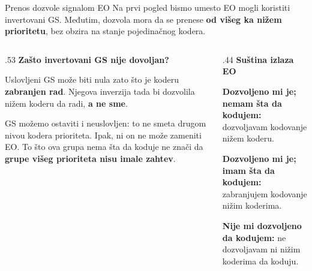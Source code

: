 \begin{frame}[t,label=03-s020b]{Prenos dozvole signalom EO}
\setlength{\parskip}{0pt}
\fontsize{11}{13}\selectfont
Na prvi pogled bismo umesto EO mogli koristiti invertovani GS.
Međutim, dozvola mora da se prenese \textbf{od višeg ka nižem prioritetu},
bez obzira na stanje pojedinačnog kodera.
\par\vspace{2mm}
\begin{columns}[T,onlytextwidth]
\begin{column}{.53\textwidth}
\textcolor{DEisticanje}{\textbf{Zašto invertovani GS nije dovoljan?}}
\par\vspace{1.5mm}
Uslovljeni GS može biti nula zato što je koderu \textbf{zabranjen rad}.
Njegova inverzija tada bi dozvolila nižem koderu da radi, \textbf{a ne sme}.
\par\vspace{1.5mm}
GS možemo ostaviti i neuslovljen: to ne smeta drugom nivou kodera prioriteta.
Ipak, ni on ne može zameniti EO. To što ova grupa nema šta da koduje
ne znači da \textbf{grupe višeg prioriteta nisu imale zahtev}.
\end{column}
\begin{column}{.44\textwidth}
\textcolor{DEisticanje}{\textbf{Suština izlaza EO}}
\par\vspace{1.5mm}
\textbf{Dozvoljeno mi je; nemam šta da kodujem:}
dozvoljavam kodovanje nižem koderu.
\par\vspace{2mm}
\textbf{Dozvoljeno mi je; imam šta da kodujem:}
zabranjujem kodovanje nižim koderima.
\par\vspace{2mm}
\textbf{Nije mi dozvoljeno da kodujem:}
ne dozvoljavam ni nižim koderima da koduju.
\end{column}
\end{columns}
\end{frame}
